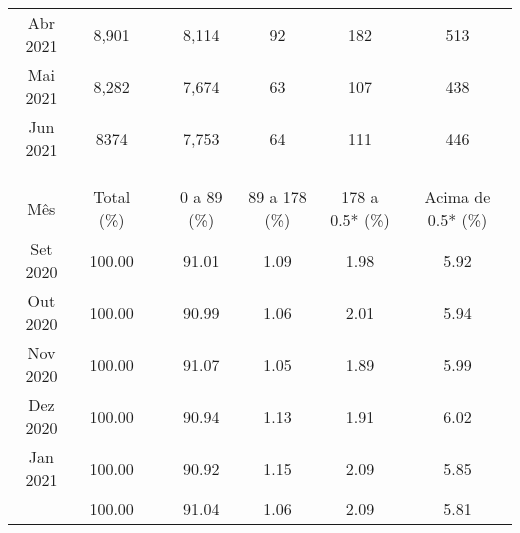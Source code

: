 \documentclass[12pt]{article}
\begin{document}
\begin{table}[htbp]
\begin{adjustbox}{max width=\linewidth}
\begin{tabular}{p{4.585em}llllll}
    \multicolumn{1}{c}{Abr 2021} & \multicolumn{1}{c}{8,901} &      & \multicolumn{1}{c}{8,114} & \multicolumn{1}{c}{92} & \multicolumn{1}{c}{182} & \multicolumn{1}{c}{513} \\
    \multicolumn{1}{c}{Mai 2021} & \multicolumn{1}{c}{8,282} &      & \multicolumn{1}{c}{7,674} & \multicolumn{1}{c}{63} & \multicolumn{1}{c}{107} & \multicolumn{1}{c}{438} \\
    \multicolumn{1}{c}{Jun 2021} & \multicolumn{1}{c}{8374} &      & \multicolumn{1}{c}{7,753} & \multicolumn{1}{c}{64} & \multicolumn{1}{c}{111} & \multicolumn{1}{c}{446} \\
\cmidrule{1-2}\cmidrule{4-7}    \multicolumn{1}{r}{} &      &      &      &      &      &  \\
    \multicolumn{1}{r}{} &      &      &      &      &      &  \\
    \multicolumn{1}{r}{} &      &      & \multicolumn{4}{c}{} \\
\cmidrule{1-2}\cmidrule{4-7}    \multicolumn{1}{c}{Mês} & \multicolumn{1}{c}{Total (\%)} &      & \multicolumn{1}{c}{0 a 89 (\%)} & \multicolumn{1}{c}{89 a 178 (\%)} & \multicolumn{1}{c}{178 a 0.5* (\%)} & \multicolumn{1}{c}{Acima de 0.5* (\%)} \\
\cmidrule{1-2}\cmidrule{4-7}    \multicolumn{1}{c}{Set 2020} & \multicolumn{1}{c}{100.00} &      & \multicolumn{1}{c}{91.01} & \multicolumn{1}{c}{1.09} & \multicolumn{1}{c}{1.98} & \multicolumn{1}{c}{5.92} \\
    \multicolumn{1}{c}{Out 2020} & \multicolumn{1}{c}{100.00} &      & \multicolumn{1}{c}{90.99} & \multicolumn{1}{c}{1.06} & \multicolumn{1}{c}{2.01} & \multicolumn{1}{c}{5.94} \\
    \multicolumn{1}{c}{Nov 2020} & \multicolumn{1}{c}{100.00} &      & \multicolumn{1}{c}{91.07} & \multicolumn{1}{c}{1.05} & \multicolumn{1}{c}{1.89} & \multicolumn{1}{c}{5.99} \\
    \multicolumn{1}{c}{Dez 2020} & \multicolumn{1}{c}{100.00} &      & \multicolumn{1}{c}{90.94} & \multicolumn{1}{c}{1.13} & \multicolumn{1}{c}{1.91} & \multicolumn{1}{c}{6.02} \\
    \multicolumn{1}{c}{Jan 2021} & \multicolumn{1}{c}{100.00} &      & \multicolumn{1}{c}{90.92} & \multicolumn{1}{c}{1.15} & \multicolumn{1}{c}{2.09} & \multicolumn{1}{c}{5.85} \\
    \rowcolor[rgb]{ .851,  .851,  .851} \multicolumn{1}{c}{Fev 2021} & \multicolumn{1}{c}{100.00} &      & \multicolumn{1}{c}{91.04} & \multicolumn{1}{c}{1.06} & \multicolumn{1}{c}{2.09} & \multicolumn{1}{c}{5.81} \\

\end{tabular}
\end{adjustbox}
\end{table}
\end{document}
